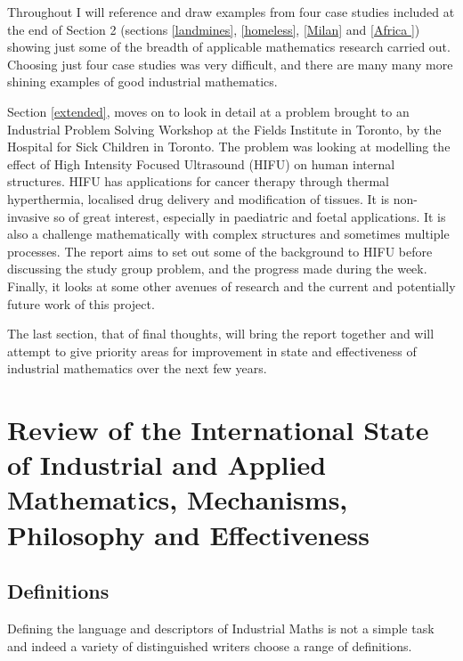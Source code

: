 \documentclass[11pt]{article} %
\begin{document}
	Throughout I will reference and draw examples from four case studies included at the end of Section 2 (sections \ref{landmines}, \ref{homeless}, \ref{Milan} and \ref{Africa }) showing just some of the breadth of applicable mathematics research carried out. Choosing just four case studies was very difficult, and there are many many more shining examples of good industrial mathematics. 
	
	Section \ref{extended}, moves on to look in detail at a problem brought to an Industrial Problem Solving Workshop at the Fields Institute in Toronto, by the Hospital for Sick Children in Toronto. The problem was looking at modelling the effect of High Intensity Focused Ultrasound (HIFU) on human internal structures. HIFU has applications for cancer therapy through thermal hyperthermia, localised drug delivery and modification of tissues. It is non-invasive so of great interest, especially in paediatric and foetal applications. It is also a challenge mathematically with complex structures and sometimes multiple processes. The report aims to set out some of the background to HIFU before discussing the study group problem, and the progress made during the week. Finally, it looks at some other avenues of research and the current and potentially future work of this project. 
	
	The last section, that of final thoughts, will bring the report together and will attempt to give priority areas for improvement in state and effectiveness of industrial mathematics over the next few years. 
	
	\pagebreak
	\section{Review of the International State of Industrial and Applied Mathematics, Mechanisms, Philosophy and Effectiveness}
	

	
	\subsection{Definitions \label{definitions} }
	
	Defining the language and descriptors of  Industrial Maths is not a simple task and indeed a variety of distinguished writers choose a range of definitions. 
	
\end{document}
